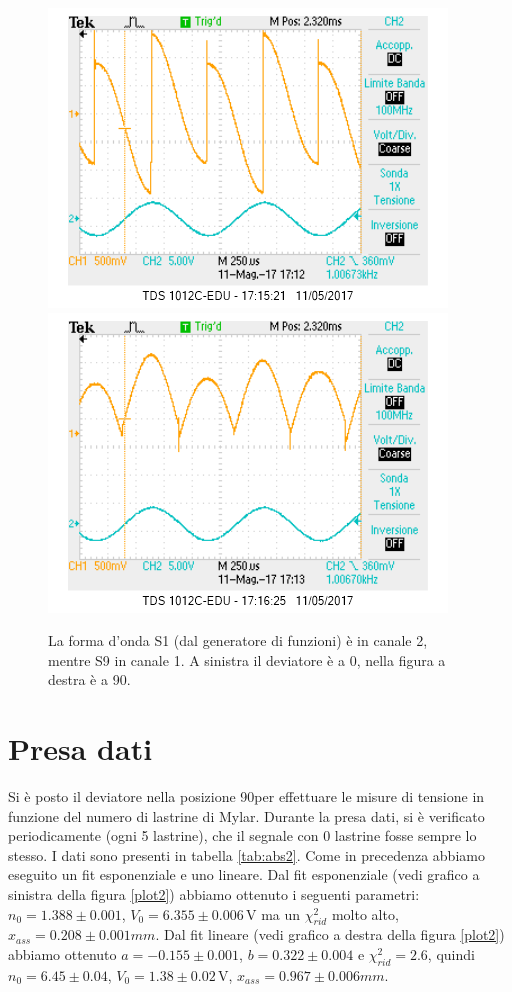 \documentclass[10pt,a4paper]{article}
\begin{document}
\begin{figure}[!htb]
  \centering
  \includegraphics[scale=0.45]{dev0ch1S9-ch2S1(zero).png}\includegraphics[scale=0.45]{dev90ch1S9-ch2S1(zero).png}
\caption{La forma d'onda S1 (dal generatore di funzioni) è in canale 2, mentre S9 in canale 1. A sinistra il deviatore è a 0\degree, nella figura a destra è a 90\degree. \label{osc:devS9}}
\end{figure}

\section{Presa dati}
Si è posto il deviatore nella posizione 90\degree per effettuare le misure di tensione in funzione del numero di lastrine di Mylar. Durante la presa dati, si è verificato periodicamente (ogni 5 lastrine), che il segnale con 0 lastrine fosse sempre lo stesso. I dati sono presenti in tabella \ref{tab:abs2}. Come in precedenza abbiamo eseguito un fit esponenziale e uno lineare. Dal fit esponenziale (vedi grafico a sinistra della figura \ref{plot2}) abbiamo ottenuto i seguenti parametri: $n_0= 1.388\pm 0.001$, $V_0=6.355\pm0.006\,\mbox{V}$ ma un $\chi^2_{rid}$ molto alto, $x_{ass}=0.208\pm0.001{mm}$. Dal fit lineare (vedi grafico a destra della figura \ref{plot2}) abbiamo ottenuto $a=-0.155\pm0.001$, $b=0.322\pm0.004$ e $\chi^2_{rid}=2.6$, quindi $n_0= 6.45\pm 0.04$, $V_0=1.38\pm0.02\,\mbox{V}$, $x_{ass}=0.967\pm0.006{mm}$.
\end{document}
